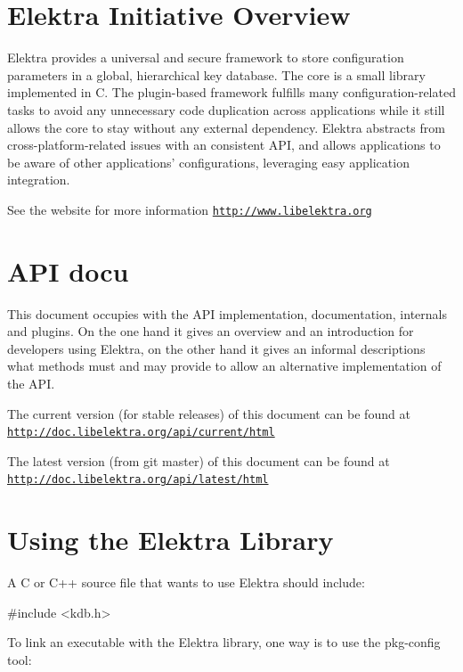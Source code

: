\hypertarget{index_overview}{}\section{Elektra Initiative Overview}\label{index_overview}
Elektra provides a universal and secure framework to store configuration parameters in a global, hierarchical key database. The core is a small library implemented in C. The plugin-\/based framework fulfills many configuration-\/related tasks to avoid any unnecessary code duplication across applications while it still allows the core to stay without any external dependency. Elektra abstracts from cross-\/platform-\/related issues with an consistent A\-P\-I, and allows applications to be aware of other applications' configurations, leveraging easy application integration.

See the website for more information \href{http://www.libelektra.org}{\tt http\-://www.\-libelektra.\-org}\hypertarget{index_focus}{}\section{A\-P\-I docu}\label{index_focus}
This document occupies with the A\-P\-I implementation, documentation, internals and plugins. On the one hand it gives an overview and an introduction for developers using Elektra, on the other hand it gives an informal descriptions what methods must and may provide to allow an alternative implementation of the A\-P\-I.

The current version (for stable releases) of this document can be found at \href{http://doc.libelektra.org/api/current/html}{\tt http\-://doc.\-libelektra.\-org/api/current/html}

The latest version (from git master) of this document can be found at \href{http://doc.libelektra.org/api/latest/html}{\tt http\-://doc.\-libelektra.\-org/api/latest/html}\hypertarget{index_using}{}\section{Using the Elektra Library}\label{index_using}
A C or C++ source file that wants to use Elektra should include\-: 
\begin{DoxyCode}
\textcolor{preprocessor}{#include <kdb.h>}
\end{DoxyCode}


To link an executable with the Elektra library, one way is to use the {\ttfamily pkg-\/config} tool\-: 


